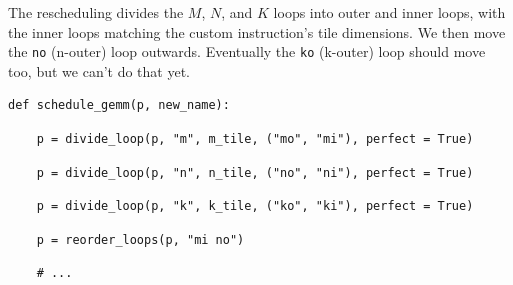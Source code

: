 \hfill
\begin{minipage}[t]{0.5\textwidth}\codeminipage
The rescheduling divides the $M$, $N$, and $K$ loops into outer and inner loops, with the inner loops matching the custom instruction's tile dimensions.
We then move the \texttt{no} (n-outer) loop outwards.
Eventually the \texttt{ko} (k-outer) loop should move too, but we can't do that yet.
\vspace{1cm}
\tiny
\begin{verbatim}
def schedule_gemm(p, new_name):
\end{verbatim}
\begin{mdframed}[style=MyFrame, backgroundcolor=yellowBoxBg]
\color{yellowBoxFg}
\begin{verbatim}
    p = divide_loop(p, "m", m_tile, ("mo", "mi"), perfect = True)
\end{verbatim}
\end{mdframed}
\begin{mdframed}[style=MyFrame, backgroundcolor=greenBoxBg]
\color{greenBoxFg}
\begin{verbatim}
    p = divide_loop(p, "n", n_tile, ("no", "ni"), perfect = True)
\end{verbatim}
\end{mdframed}
\begin{mdframed}[style=MyFrame, backgroundcolor=violetBoxBg]
\color{violetBoxFg}
\begin{verbatim}
    p = divide_loop(p, "k", k_tile, ("ko", "ki"), perfect = True)
\end{verbatim}
\end{mdframed}
\begin{mdframed}[style=MyFrame, backgroundcolor=blueBoxBg]
\color{blueBoxFg}
\begin{verbatim}
    p = reorder_loops(p, "mi no")
\end{verbatim}
\end{mdframed}
\begin{verbatim}
    # ...
\end{verbatim}
\end{minipage}
\newpage
{}


